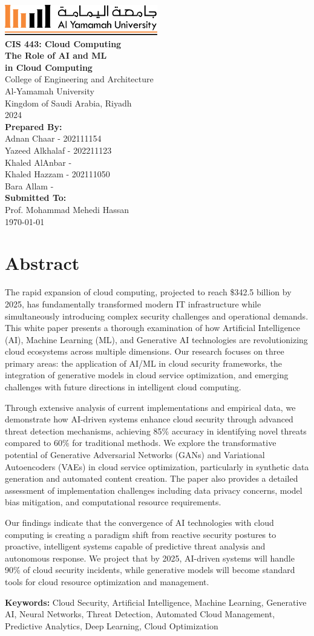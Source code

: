 \documentclass[a4paper,12pt]{article}
\def\maketitle{
  \begin{titlepage}
    \centering
    \vspace*{-1cm}
    \includegraphics[width=0.5\textwidth]{yu-logo.png}\\[2cm]
    {\huge\bfseries CIS 443: Cloud Computing \\[0.5cm] The Role of AI and ML\\[0.25cm]in Cloud Computing}\\[2cm]
    {\Large College of Engineering and Architecture}\\
    {Al-Yamamah University}\\
    {Kingdom of Saudi Arabia, Riyadh}\\[1cm]
    2024\\[2cm]
    {\large\bfseries Prepared By:}\\[0.3cm]
    Adnan Chaar - 202111154\\
    Yazeed Alkhalaf - 202211123\\
    Khaled AlAnbar - \\
    Khaled Hazzam - 202111050\\
    Bara Allam - \\
    [2cm]
    {\large\bfseries Submitted To:}\\[0.3cm]
    Prof. Mohammad Mehedi Hassan\\[2cm]
    {\large \today}
    \vfill
  \end{titlepage}
}
\begin{document}
\maketitle

\thispagestyle{fancy}
\tableofcontents
\newpage
\thispagestyle{fancy}
\listoffigures
\newpage

\setcounter{page}{1}

\section*{Abstract}
The rapid expansion of cloud computing, projected to reach \$342.5 billion by 2025, has fundamentally transformed modern IT infrastructure while simultaneously introducing complex security challenges and operational demands. This white paper presents a thorough examination of how Artificial Intelligence (AI), Machine Learning (ML), and Generative AI technologies are revolutionizing cloud ecosystems across multiple dimensions. Our research focuses on three primary areas: the application of AI/ML in cloud security frameworks, the integration of generative models in cloud service optimization, and emerging challenges with future directions in intelligent cloud computing.

Through extensive analysis of current implementations and empirical data, we demonstrate how AI-driven systems enhance cloud security through advanced threat detection mechanisms, achieving 85\% accuracy in identifying novel threats compared to 60\% for traditional methods. We explore the transformative potential of Generative Adversarial Networks (GANs) and Variational Autoencoders (VAEs) in cloud service optimization, particularly in synthetic data generation and automated content creation. The paper also provides a detailed assessment of implementation challenges including data privacy concerns, model bias mitigation, and computational resource requirements.

Our findings indicate that the convergence of AI technologies with cloud computing is creating a paradigm shift from reactive security postures to proactive, intelligent systems capable of predictive threat analysis and autonomous response. We project that by 2025, AI-driven systems will handle 90\% of cloud security incidents, while generative models will become standard tools for cloud resource optimization and management.

\textbf{Keywords:} Cloud Security, Artificial Intelligence, Machine Learning, Generative AI, Neural Networks, Threat Detection, Automated Cloud Management, Predictive Analytics, Deep Learning, Cloud Optimization
\end{document}
